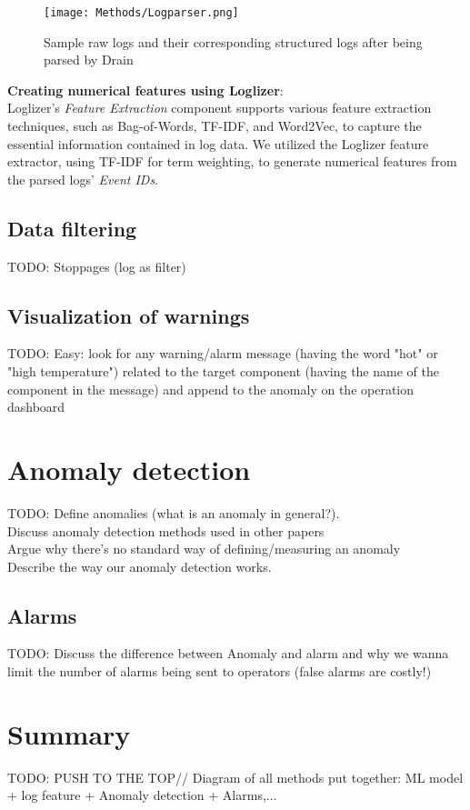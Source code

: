     \begin{figure}[!htbp]
      \begin{center}
        \texttt{[image: Methods/Logparser.png]}
      \end{center}
      \caption{Sample raw logs and their corresponding structured logs after being parsed by Drain}
      \label{fig:logparser}
    \end{figure}

    \begin{flushleft}
      \textbf{Creating numerical features using Loglizer}:\\
      Loglizer's \emph{Feature Extraction} component supports various feature extraction techniques, such as Bag-of-Words, TF-IDF, and Word2Vec, 
      to capture the essential information contained in log data. We utilized the Loglizer feature extractor, using TF-IDF \cite{TF-IDF} for term weighting, to generate numerical 
      features from the parsed logs' \emph{Event IDs}. 
    \end{flushleft}

\subsection{Data filtering}
  TODO:
  Stoppages (log as filter)

\subsection{Visualization of warnings}
  TODO:
  Easy: look for any warning/alarm message (having the word "hot" or "high temperature") related to the target component (having the name of the component in the message) 
  and append to the anomaly on the operation dashboard

  \clearpage

\section{Anomaly detection}
  TODO:
  Define anomalies (what is an anomaly in general?).\\
  Discuss anomaly detection methods used in other papers\\
  Argue why there's no standard way of defining/measuring an anomaly\\
  Describe the way our anomaly detection works.

\subsection{Alarms}
  TODO:
  Discuss the difference between Anomaly and alarm and why we wanna limit the number of alarms being sent to operators (false alarms are costly!)

\section{Summary}
TODO:
PUSH TO THE TOP//
Diagram of all methods put together: ML model + log feature + Anomaly detection + Alarms,...